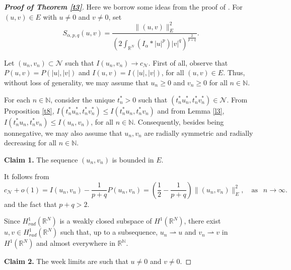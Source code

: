 \documentclass[12pt,a4paper]{article}
\numberwithin{equation}{section}
\begin{document}
\medbreak


\begin{proof}[\bf{Proof of Theorem \ref{t3}}] Here we borrow some ideas from the proof of \cite[Proposition 2.2]{Moroz2013}. For $(u,v) \in E$ with $u \neq 0$ and $v \neq 0$, set
\[
S_{\alpha, p,q} (u,v) = \frac{\|(u,v)\|_E^2}{\left(2\int_{\mathbb{R}^N} (I_{\alpha} \ast |u|^p)|v|^q \right)^{\frac{2}{p+q}}}.
\]

Let $(u_{n}, v_{n})\subset \mathcal{N}$ such that $I(u_{n}, v_{n})\rightarrow c_\mathcal{N}$. First of all,  observe that $P(u, v) =  P(|u|, |v|)$ and $I(u, v)=I(|u|, |v|)$, for all $(u,v) \in E$. Thus, without loss of generality, we may assume that $u_{n} \geq 0$ and $v_{n} \geq 0$ for all $n\in \mathbb{N}$. 

For each $n\in \mathbb{N}$, consider the unique $t_{n}^{\ast}>0$ such that $(t_{n}^{\ast}u_{n}^{\ast}, t_{n}^{\ast}v_{n}^{\ast})\in \mathcal{N}$. From Proposition \ref{t8}, $I(t_{n}^{\ast}u_{n}^{\ast}, t_{n}^{\ast}v_{n}^{\ast}) \leq I(t_{n}^{\ast}u_{n}, t_{n}^{\ast}v_{n})$ and from Lemma \ref{l3}, $I(t_{n}^{\ast}u_{n}, t_{n}^{\ast}v_{n})\leq I(u_{n}, v_{n})$, for all $n\in \mathbb{N}$. Consequently, besides being nonnegative, we may also assume that $u_{n}, v_{n}$ are radially symmetric and radially decreasing for all $n \in \mathbb{N}$.



\noindent \textbf{Claim 1.} The sequence $(u_{n}, v_{n})$ is bounded in $E$.

It follows from 
\[
c_\mathcal{N} + o(1) = I(u_{n}, v_{n}) - \dfrac{1}{p+q}P(u_{n}, v_{n}) = \left(\dfrac{1}{2}-\dfrac{1}{p+q}\right)\|(u_{n}, v_{n})\|_{E}^{2}, \quad \text{as }\ \ n \to \infty.
\]
and the fact that $p+q>2$.

\medbreak

Since $H_{rad}^{1}(\mathbb{R}^N)$ is a weakly closed subspace of $H^{1}(\mathbb{R}^N)$, there exist $u,v \in H^1_{rad}(\mathbb{R}^N)$ such that, up to a subsequence, $u_{n} \rightharpoonup u$ and $v_{n} \rightharpoonup v$ in $H^{1}(\mathbb{R}^N)$ and almost everywhere in $\mathbb{R^N}$. 

\medbreak

\noindent \textbf{Claim 2.} The week limits are such that $u\neq0$ and $v \neq0$.



\end{proof}
\end{document}
